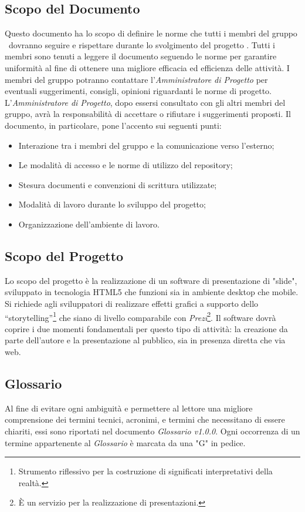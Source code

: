 \subsection{Scopo del Documento}
Questo documento ha lo scopo di definire le norme che tutti i membri del gruppo \GRUPPO\ dovranno seguire e rispettare durante lo svolgimento del progetto \PROGETTO. Tutti i membri sono tenuti a leggere il documento seguendo le norme per garantire uniformità al fine di ottenere una migliore efficacia ed efficienza delle attività.
I membri del gruppo potranno contattare l'\textit{Amministratore di Progetto} per eventuali suggerimenti, consigli, opinioni riguardanti le norme di progetto. 
L'\textit{Amministratore di Progetto}, dopo essersi consultato con gli altri membri del gruppo, avrà la responsabilità di accettare o rifiutare i suggerimenti proposti. 
Il documento, in particolare, pone l'accento sui seguenti punti:

\begin{itemize}
	\item Interazione tra i membri del gruppo e la comunicazione verso l'esterno;
	\item Le modalità di accesso e le norme di utilizzo del repository;
	\item Stesura documenti e convenzioni di scrittura utilizzate;
	\item Modalità di lavoro durante lo sviluppo del progetto;
	\item Organizzazione dell'ambiente di lavoro.
\end{itemize}

\subsection{Scopo del Progetto}
Lo scopo del progetto è la realizzazione di un software di presentazione di "slide", sviluppato in tecnologia HTML5 che funzioni sia in ambiente desktop che mobile.
Si richiede agli sviluppatori di realizzare effetti grafici a supporto dello “storytelling”\footnote{Strumento riflessivo per la costruzione di significati interpretativi della realtà.} che siano di livello comparabile con \textit{Prezi}\footnote{È un servizio per la realizzazione di presentazioni.}.
Il software dovrà coprire i due momenti fondamentali per questo tipo di attività: la creazione da parte dell'autore e la presentazione al pubblico, sia in presenza diretta che via web.

\subsection{Glossario}
Al fine di evitare ogni ambiguità e permettere al lettore una migliore comprensione dei termini tecnici, acronimi, e termini che necessitano di essere chiariti,  essi sono riportati nel documento \textit{Glossario v1.0.0}. 
Ogni occorrenza  di un termine appartenente al \textit{Glossario} è marcata da una "G" in pedice.


